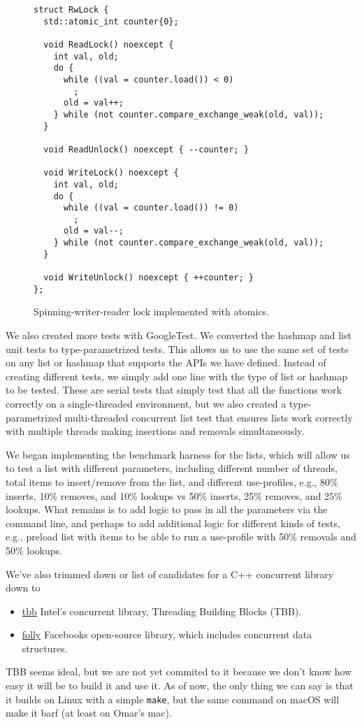 \documentclass[11pt]{article}
\begin{document}
\begin{figure}
\begin{center}
\begin{lstlisting}
struct RwLock {
  std::atomic_int counter{0};

  void ReadLock() noexcept {
    int val, old;
    do {
      while ((val = counter.load()) < 0)
        ;
      old = val++;
    } while (not counter.compare_exchange_weak(old, val));
  }

  void ReadUnlock() noexcept { --counter; }

  void WriteLock() noexcept {
    int val, old;
    do {
      while ((val = counter.load()) != 0)
        ;
      old = val--;
    } while (not counter.compare_exchange_weak(old, val));
  }

  void WriteUnlock() noexcept { ++counter; }
};
\end{lstlisting}
\caption{Spinning-writer-reader lock implemented with atomics.}
\label{fig:rwlock}
\end{center}
\end{figure}

We also created more tests with GoogleTest. We converted the hashmap and list
unit tests to type-parametrized tests. This allows us to use the same set of
tests on any list or hashmap that supports the APIs we have defined. Instead of
creating different tests, we simply add one line with the type of list or
hashmap to be tested. These are serial tests that simply test that all the
functions work correctly on a single-threaded environment, but we also created a
type-parametrized multi-threaded concurrent list test that ensures lists work
correctly with multiple threads making insertions and removals simultaneously.

We began implementing the benchmark harness for the lists, which will allow us
to test a list with different parameters, including different number of threads,
total items to insert/remove from the list, and different use-profiles, e.g.,
80\% inserts, 10\% removes, and 10\% lookups vs 50\% inserts, 25\% removes, and
25\% lookups. What remains is to add logic to pass in all the parameters via the
command line, and perhaps to add additional logic for different kinds of tests,
e.g., preload list with items to be able to run a use-profile with 50\% removals
and 50\% lookups.


We've also trimmed down or list of candidates for a C++ concurrent library down
to
\begin{itemize}
\item
\href{https://github.com/01org/tbb}{tbb} Intel's concurrent library, Threading
Building Blocks (TBB).
\item
\href{https://github.com/facebook/folly}{folly} Facebooks open-source library,
which includes concurrent data structures.
\end{itemize}
TBB seems ideal, but we are not yet commited to it because we don't know how easy
it will be to build it and use it. As of now, the only thing we can say is that it
builds on Linux with a simple {\tt make}, but the same command on macOS will make
it barf (at least on Omar's mac).
\end{document}
